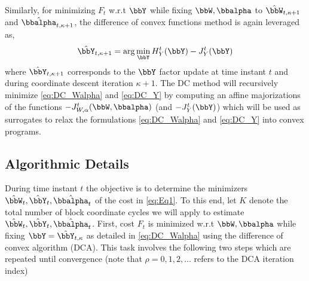 \documentclass[10pt,final]{IEEEtran}
\begin{document}
Similarly, for minimizing $F_t$ w.r.t $\bbY$ while fixing $\bbW,\bbalpha$
to $\hat{\bbW}_{t,\kappa+1}$ and $\hat{\bbalpha}_{t,\kappa+1}$, the difference of convex functions method is again leveraged as,
\begin{align}\label{eq:DC_Y}
\hat{\bbY}_{t,\kappa+1}=\arg\min_{\bbY}H_{Y}^t(\bbY)-J_{Y}^t(\bbY)
\end{align}
where $\hat{\bbY}_{t,\kappa+1}$ corresponds to the $\bbY$ factor update at time instant $t$ and during coordinate descent iteration $\kappa+1$. The DC method will recursively minimize \eqref{eq:DC_Walpha} and \eqref{eq:DC_Y}  by computing an affine majorizations of the functions 
$-J_{W,\alpha}^t(\bbW,\bbalpha)$ (and $-J_{Y}^t(\bbY)$) which will be used as surrogates to relax the formulations \eqref{eq:DC_Walpha} and \eqref{eq:DC_Y} into  convex programs.

\subsection{Algorithmic Details}\label{sec:alg}
During time instant $t$ the objective is to determine the minimizers $\hat{\bbW}_t,\hat{\bbY}_t,\hat{\bbalpha}_t$ of the cost in \eqref{eq:Eq1}.
To this end, let $K$ denote the total number of block coordinate cycles we will apply to estimate $\hat{\bbW}_t,\hat{\bbY}_t,\hat{\bbalpha}_t$. First,  cost $F_t$ is minimized w.r.t  $\bbW,\bbalpha$ while fixing $\bbY=\hat{\bbY}_{t,\kappa}$
as detailed in \eqref{eq:DC_Walpha} using the difference of convex algorithm (DCA). This task involves the following two steps which are repeated until convergence (note that $\rho=0,1,2,\ldots$ refers to the DCA iteration index)
\end{document}
